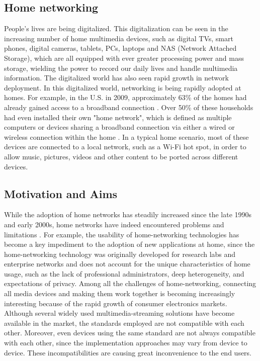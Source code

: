 
\subsection{Home networking}
People's lives are being digitalized. This digitalization can be seen in the
increasing number of home multimedia devices, such as digital TVs, smart
phones, digital cameras, tablets, PCs, laptops and NAS (Network Attached
Storage), which are all equipped with ever greater processing power and mass
storage, wielding the power to record our daily lives and handle multimedia
information. The digitalized world has also seen rapid growth in network
deployment.  In this digitalized world, networking is being rapidly adopted at
homes. For example, in the U.S. in 2009, approximately 63\% of the homes had
already gained access to a broadband connection \cite{stateofHN}. Over 50\% of
these households had even installed their own "home network", which is defined as
multiple computers or devices sharing a broadband connection via either a wired
or wireless connection within the home \cite{standards-perspective}. In a typical home
scenario, most of these devices are connected to a local network, such as a
Wi-Fi hot spot, in order to allow music, pictures, videos and other content to
be ported across different devices.

\subsection{Motivation and Aims}
While the adoption of home networks has steadily increased since the late 1990s
and early 2000s, home networks have indeed encountered problems and limitations
\cite{stateofHN}. For example, the usability of home-networking technologies has
become a key impediment to the adoption of new applications at home, since the
home-networking technology was originally developed for research labs and
enterprise networks and does not account for the unique characteristics of home
usage, such as the lack of professional administrators, deep heterogeneity, and
expectations of privacy. Among all the challenges of home-networking,
connecting all media devices and making them work together is becoming
increasingly interesting because of the rapid growth of consumer electronics
markets. Although several widely used multimedia-streaming solutions have
become available in the market, the standards employed are not compatible with
each other. Moreover, even devices using the same standard are not always
compatible with each other, since the implementation approaches may vary from
device to device. These incompatibilities are causing great inconvenience to
the end users.

